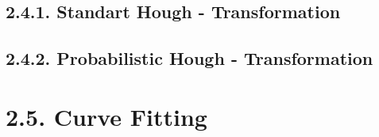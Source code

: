 %
\subsection*{2.4.1. Standart Hough - Transformation}\label{sec:Standart Hough - Transformation}
%


%
\subsection*{2.4.2. Probabilistic Hough - Transformation}\label{sec:Probabilistic Hough - Transformation}
%



%
\section*{2.5. Curve Fitting}\label{sec:Curve Fitting}
%

%





